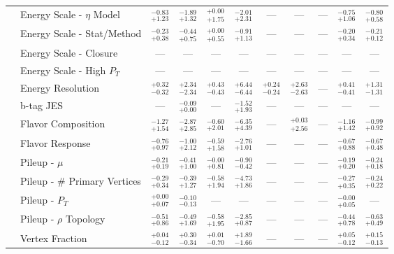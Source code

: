\begin{tabular}{|cl||ccccccc|c||c|}
\cline{2-11}
&Energy Scale - $\eta$ Model &  $^{-0.83}_{+1.23}$  &  $^{-1.89}_{+1.32}$  &  $^{+0.00}_{+1.75}$  &  $^{-2.01}_{+2.31}$  & --- & --- & --- &  $^{-0.75}_{+1.06}$  &  $^{-0.80}_{+0.58}$ \\ 
\cline{2-11}
&Energy Scale - Stat/Method &  $^{-0.23}_{+0.38}$  &  $^{-0.44}_{+0.75}$  &  $^{+0.00}_{+0.55}$  &  $^{-0.91}_{+1.13}$  & --- & --- & --- &  $^{-0.20}_{+0.34}$  &  $^{-0.21}_{+0.12}$ \\ 
\cline{2-11}
&Energy Scale - Closure  & --- & --- & --- & --- & --- & --- & --- & --- & ---\\ 
\cline{2-11}
&Energy Scale - High $P_{T}$ & --- & --- & --- & --- & --- & --- & --- & --- & ---\\ 
\cline{2-11}
&Energy Resolution &  $^{+0.32}_{-0.32}$  &  $^{+2.34}_{-2.34}$  &  $^{+0.43}_{-0.43}$  &  $^{+6.44}_{-6.44}$  &  $^{+0.24}_{-0.24}$  &  $^{+2.63}_{-2.63}$  & --- &  $^{+0.41}_{-0.41}$  &  $^{+1.31}_{-1.31}$ \\ 
\cline{2-11}
&b-tag JES & --- &  $^{-0.09}_{+0.00}$  & --- &  $^{-1.52}_{+1.93}$  & --- & --- & --- & --- & ---\\ 
\cline{2-11}
&Flavor Composition &  $^{-1.27}_{+1.54}$  &  $^{-2.87}_{+2.85}$  &  $^{-0.60}_{+2.01}$  &  $^{-6.35}_{+4.39}$  & --- &  $^{+0.03}_{+2.56}$  & --- &  $^{-1.16}_{+1.42}$  &  $^{-0.99}_{+0.92}$ \\ 
\cline{2-11}
&Flavor Response &  $^{-0.76}_{+0.97}$  &  $^{-1.00}_{+2.12}$  &  $^{-0.59}_{+1.58}$  &  $^{-2.76}_{+1.01}$  & --- & --- & --- &  $^{-0.67}_{+0.88}$  &  $^{-0.67}_{+0.48}$ \\ 
\cline{2-11}
&Pileup - $\mu$ &  $^{-0.21}_{+0.19}$  &  $^{-0.41}_{+1.00}$  &  $^{-0.00}_{+0.81}$  &  $^{-0.90}_{-0.42}$  & --- & --- & --- &  $^{-0.19}_{+0.20}$  &  $^{-0.24}_{+0.18}$ \\ 
\cline{2-11}
&Pileup - \# Primary Vertices &  $^{-0.29}_{+0.34}$  &  $^{-0.39}_{+1.27}$  &  $^{-0.58}_{+1.94}$  &  $^{-4.73}_{+1.86}$  & --- & --- & --- &  $^{-0.27}_{+0.35}$  &  $^{-0.24}_{+0.22}$ \\ 
\cline{2-11}
&Pileup -  $P_{T}$ &  $^{+0.00}_{+0.07}$  &  $^{-0.10}_{-0.13}$  & --- & --- & --- & --- & --- &  $^{-0.00}_{+0.05}$  & ---\\ 
\cline{2-11}
&Pileup - $\rho$ Topology &  $^{-0.51}_{+0.86}$  &  $^{-0.49}_{+1.69}$  &  $^{-0.58}_{+1.95}$  &  $^{-2.85}_{+0.87}$  & --- & --- & --- &  $^{-0.44}_{+0.78}$  &  $^{-0.63}_{+0.49}$ \\ 
\cline{2-11}
&Vertex Fraction &  $^{+0.04}_{-0.12}$  &  $^{+0.30}_{-0.34}$  &  $^{+0.01}_{-0.70}$  &  $^{+1.89}_{-1.66}$  & --- & --- & --- &  $^{+0.05}_{-0.12}$  &  $^{+0.15}_{-0.13}$ \\ 

\end{tabular}
